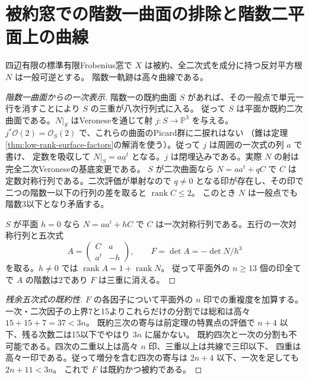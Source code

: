 \section{被約窓での階数一曲面の排除と階数二平面上の曲線}
\label{sec:rank-one-surface-exclusion}
\begin{theorem}\label{thm:rank-one-surface-exclusion}
四辺有限の標準有限Frobenius窓で $X$ は被約、全二次式を成分に持つ反対平方根 $N$ は一般可逆とする。
階数一軌跡は高々曲線である。
\end{theorem}
\begin{proof}[階数一曲面からの一次表示]
階数一の既約曲面 $S$ があれば、その一般点で単元一行を消すことにより $S$ の三重が八次行列式に入る。
従って $S$ は平面か既約二次曲面である。$N|_S$ はVeroneseを通じて射 $j:S\to\mathbb P^3$ を与える。
$j^*\mathcal O(2)=\mathcal O_S(2)$ で、これらの曲面のPicard群に二捩れはない
（錐は定理\ref{thm:low-rank-surface-factors}の解消を使う）。従って $j$ は周囲の一次式の列 $a$ で書け、
定数を吸収して $N|_S=aa^t$ となる。$j$ は閉埋込みである。実際 $N$ の射は完全二次Veroneseの基底変更である。
$S$ が二次曲面なら $N=aa^t+qC$ で $C$ は定数対称行列である。二次評価が単射なので
$q\ne0$ となる印が存在し、その印で二つの階数一以下の行列の差を取ると $\operatorname{rank}C\le2$。
このとき $N$ は一般点でも階数3以下となり矛盾する。

$S$ が平面 $h=0$ なら $N=aa^t+hC$ で $C$ は一次対称行列である。五行の一次対称行列と五次式
\[
              A=\begin{pmatrix}C&a\\a^t&-h\end{pmatrix},
                 \qquad F=\det A=-\det N/h^3
\]
を取る。$h\ne0$ では $\operatorname{rank}A=1+\operatorname{rank}N$。
従って平面外の $n\ge13$ 個の印全てで $A$ の階数は2であり $F$ は三重に消える。
\end{proof}
\begin{proof}[残余五次式の既約性]
$F$ の各因子について平面外の $n$ 印での重複度を加算する。
一次・二次因子の上界7と15よりこれらだけの分割では総和は高々 $15+15+7=37<3n$。
既約三次の寄与は前定理の特異点の評価で $n+4$ 以下、残る次数二は15以下でやはり $3n$ に届かない。
既約四次と一次の分割も不可能である。四次の二重以上は高々 $n$ 印、三重以上は共線で三印以下、
四重は高々一印である。従って増分を含む四次の寄与は $2n+4$ 以下、一次を足しても $2n+11<3n$。
これで $F$ は既約かつ被約である。
\end{proof}
